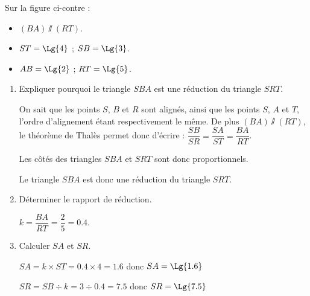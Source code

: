 \begin{corrige}
    \phantom{rrr}

    \begin{minipage}{0.3\linewidth}
         Sur la figure ci-contre : 
        \begin{itemize}
            \item $(BA)\sslash (RT)$.
            \item $ST=\Lg{4}$ ; $SB=\Lg{3}$.
            \item $AB=\Lg{2}$ ; $RT=\Lg{5}$.
        \end{itemize}
    \end{minipage}    
    \begin{minipage}{0.3\linewidth}
        \hspace*{-10mm}
    \end{minipage}

    \begin{enumerate}
        \item Expliquer pourquoi le triangle $SBA$ est une réduction du triangle $SRT$.
        
        {\color{red}On sait que les points $S$, $B$ et $R$ sont alignés, ainsi que les points $S$, $A$ et $T$,
        l'ordre d'alignement étant respectivement le même. De plus $(BA)\sslash (RT)$, le théorème de Thalès permet donc d'écrire :
        $\dfrac{SB}{SR}=\dfrac{SA}{ST}=\dfrac{BA}{RT}$.

        Les côtés des triangles $SBA$ et $SRT$ sont donc proportionnels.
        
        Le triangle $SBA$ est donc une réduction du triangle $SRT$.        
        }
        \item Déterminer le rapport de réduction.
        
        {\color{red}$k=\dfrac{BA}{RT}=\dfrac{2}{5}=\num{0.4}$.}
        \item Calculer $SA$ et $SR$.
        
        {\color{red} $SA=k\times ST=\num{0.4}\times 4=\num{1.6}$ donc $SA=\Lg{1.6}$
        
        $SR=SB\div k=3\div\num{0.4}=\num{7.5}$ donc $SR=\Lg{7.5}$
        }
    \end{enumerate}
\end{corrige}

